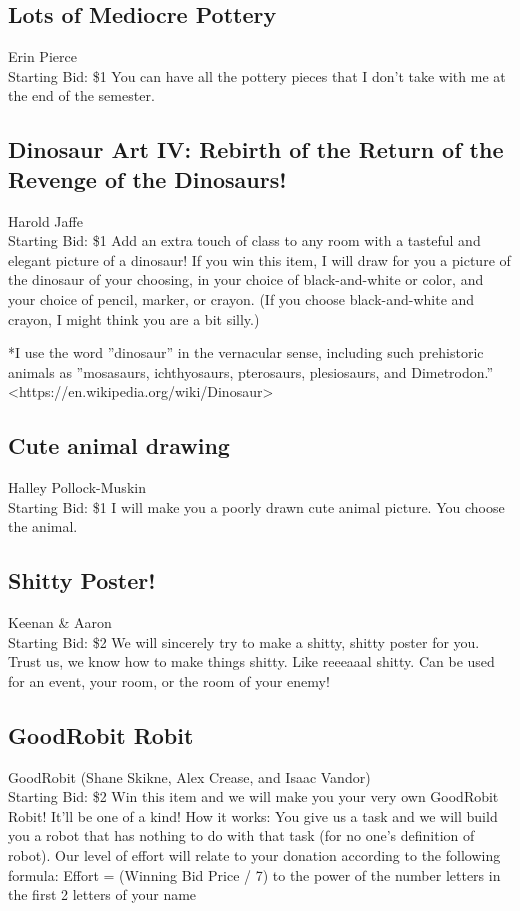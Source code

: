 \documentclass[11pt]{article}
\begin{document}
\subsection{Lots of Mediocre Pottery}
Erin Pierce
\\
Starting Bid: \$1
\newline
You can have all the pottery pieces that I don't take with me at the end of the semester.
\subsection{Dinosaur Art IV: Rebirth of the Return of the Revenge of the Dinosaurs!}
Harold Jaffe
\\
Starting Bid: \$1
\newline
Add an extra touch of class to any room with a tasteful and elegant picture of a dinosaur! If you win this item, I will draw for you a picture of the dinosaur of your choosing, in your choice of black-and-white or color, and your choice of pencil, marker, or crayon. (If you choose black-and-white and crayon, I might think you are a bit silly.)

*I use the word ”dinosaur” in the vernacular sense, including such prehistoric animals as ”mosasaurs, ichthyosaurs, pterosaurs, plesiosaurs, and Dimetrodon.” \textless https://en.wikipedia.org/wiki/Dinosaur\textgreater
\subsection{Cute animal drawing}
Halley Pollock-Muskin
\\
Starting Bid: \$1
\newline
I will make you a poorly drawn cute animal picture. You choose the animal.
\subsection{Shitty Poster!}
Keenan \& Aaron
\\
Starting Bid: \$2
\newline
We will sincerely try to make a shitty, shitty poster for you. Trust us, we know how to make things shitty. Like reeeaaal shitty. Can be used for an event, your room, or the room of your enemy!
\subsection{GoodRobit Robit}
GoodRobit (Shane Skikne, Alex Crease, and Isaac Vandor)
\\
Starting Bid: \$2
\newline
Win this item and we will make you your very own GoodRobit Robit! It'll be one of a kind! 
How it works: You give us a task and we will build you a robot that has nothing to do with that task (for no one's  definition of robot). 
Our level of effort will relate to your donation according to the following formula: Effort = (Winning Bid Price / 7) to the power of the number letters in the first 2 letters of your name
\end{document}
